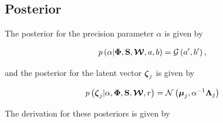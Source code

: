 	
	
	
	\subsection{Posterior}
	The posterior for the precision parameter $\alpha$ is given by
	
	\begin{align}
	p\left(\alpha|\boldsymbol{\Phi},\mathbf{S},\boldsymbol{\mathcal{W}},a,b\right) = \mathcal{G}\left(a',b'\right),
	\end{align}
	
	and the posterior for the latent vector $\boldsymbol{\zeta}_j$ is given by
	
	\begin{align}
	p\left(\boldsymbol{\zeta}_j|\alpha,\boldsymbol{\Phi},\mathbf{S},\boldsymbol{\mathcal{W}},r\right) = \mathcal{N}\left(\boldsymbol{\mu}_j,\alpha^{-1}\boldsymbol{\Lambda}_j\right)
	\end{align}
	
	The derivation for these posteriors is given by
	
